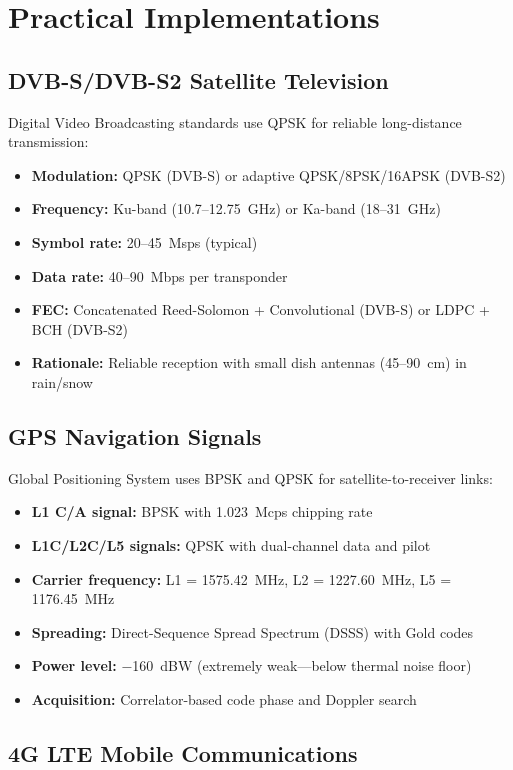 \section{Practical Implementations}

\subsection{DVB-S/DVB-S2 Satellite Television}

Digital Video Broadcasting standards use QPSK for reliable long-distance transmission:
\begin{itemize}
\item \textbf{Modulation:} QPSK (DVB-S) or adaptive QPSK/8PSK/16APSK (DVB-S2)
\item \textbf{Frequency:} Ku-band (10.7--12.75~GHz) or Ka-band (18--31~GHz)
\item \textbf{Symbol rate:} 20--45~Msps (typical)
\item \textbf{Data rate:} 40--90~Mbps per transponder
\item \textbf{FEC:} Concatenated Reed-Solomon + Convolutional (DVB-S) or LDPC + BCH (DVB-S2)
\item \textbf{Rationale:} Reliable reception with small dish antennas (45--90~cm) in rain/snow
\end{itemize}

\subsection{GPS Navigation Signals}

Global Positioning System uses BPSK and QPSK for satellite-to-receiver links:
\begin{itemize}
\item \textbf{L1 C/A signal:} BPSK with 1.023~Mcps chipping rate
\item \textbf{L1C/L2C/L5 signals:} QPSK with dual-channel data and pilot
\item \textbf{Carrier frequency:} L1 = 1575.42~MHz, L2 = 1227.60~MHz, L5 = 1176.45~MHz
\item \textbf{Spreading:} Direct-Sequence Spread Spectrum (DSSS) with Gold codes
\item \textbf{Power level:} $-$160~dBW (extremely weak---below thermal noise floor)
\item \textbf{Acquisition:} Correlator-based code phase and Doppler search
\end{itemize}

\subsection{4G LTE Mobile Communications}

